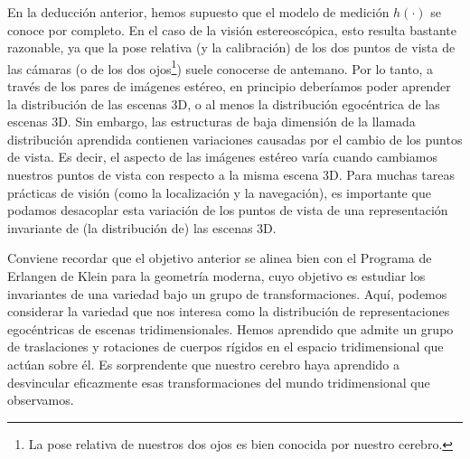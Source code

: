 \documentclass[../../book-main_es.tex]{subfiles}
\begin{document}
En la deducción anterior, hemos supuesto que el modelo de medición
$h(\cdot)$ se conoce por completo. En el caso de la visión estereoscópica, esto resulta
bastante razonable, ya que la pose relativa (y la calibración) de los dos
puntos de vista de las cámaras (o de los dos ojos\footnote{La pose relativa de nuestros dos ojos
es bien conocida por nuestro cerebro.}) suele conocerse de antemano. Por lo tanto,
a través de los pares de imágenes estéreo, en principio deberíamos poder
aprender la distribución de las escenas 3D, o al menos la distribución egocéntrica
de las escenas 3D. Sin embargo, las estructuras de baja dimensión de
la llamada distribución aprendida contienen variaciones causadas por
el cambio de los puntos de vista. Es decir, el aspecto de las imágenes estéreo
varía cuando cambiamos nuestros puntos de vista con respecto a la misma escena 3D.
Para muchas tareas prácticas de visión (como la localización y
la navegación), es importante que podamos desacoplar esta variación de
los puntos de vista de una representación invariante de (la distribución de) las escenas 3D.

\begin{remark}Conviene recordar que el objetivo anterior se alinea bien con el
    Programa de Erlangen de Klein para la geometría moderna, cuyo objetivo es estudiar
    los invariantes de una variedad bajo un grupo de transformaciones. Aquí,
    podemos considerar la variedad que nos interesa como la distribución de
    representaciones egocéntricas de escenas tridimensionales. Hemos aprendido que
    admite un grupo de traslaciones y rotaciones de cuerpos rígidos en el espacio tridimensional que actúan sobre
    él. Es sorprendente que nuestro cerebro haya aprendido a
    desvincular eficazmente esas transformaciones del mundo tridimensional que observamos.
\end{remark}
\end{document}
